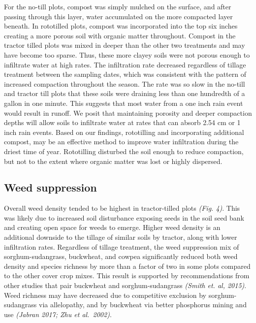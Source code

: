 \documentclass[
]{article}
\begin{document}
\hfill\break

For the no-till plots, compost was simply mulched on the surface, and after passing through this layer, water accumulated on the more compacted layer beneath.
In rototilled plots, compost was incorporated into the top six inches creating a more porous soil with organic matter throughout.
Compost in the tractor tilled plots was mixed in deeper than the other two treatments and may have become too sparse.
Thus, these more clayey soils were not porous enough to infiltrate water at high rates.
The infiltration rate decreased regardless of tillage treatment between the sampling dates, which was consistent with the pattern of increased compaction throughout the season.
The rate was so slow in the no-till and tractor till plots that these soils were draining less than one hundredth of a gallon in one minute.
This suggests that most water from a one inch rain event would result in runoff.
We posit that maintaining porosity and deeper compaction depths will allow soils to infiltrate water at rates that can absorb 2.54 cm or 1 inch rain events.
Based on our findings, rototilling and incorporating additional compost, may be an effective method to improve water infiltration during the driest time of year.
Rototilling disturbed the soil enough to reduce compaction, but not to the extent where organic matter was lost or highly dispersed.

\hypertarget{weed-suppression}{%
\subsection{Weed suppression}\label{weed-suppression}}

Overall weed density tended to be highest in tractor-tilled plots \emph{(Fig. 4)}.
This was likely due to increased soil disturbance exposing seeds in the soil seed bank and creating open space for weeds to emerge.
Higher weed density is an additional downside to the tillage of similar soils by tractor, along with lower infiltration rates.
Regardless of tillage treatment, the weed suppression mix of sorghum-sudangrass, buckwheat, and cowpea significantly reduced both weed density and species richness by more than a factor of two in some plots compared to the other cover crop mixes.
This result is supported by recommendations from other studies that pair buckwheat and sorghum-sudangrass \emph{(Smith et. al, 2015)}.
Weed richness may have decreased due to competitive exclusion by sorghum-sudangrass via allelopathy, and by buckwheat via better phosphorus mining and use \emph{(Jabran 2017; Zhu et al.~2002)}.
\end{document}
